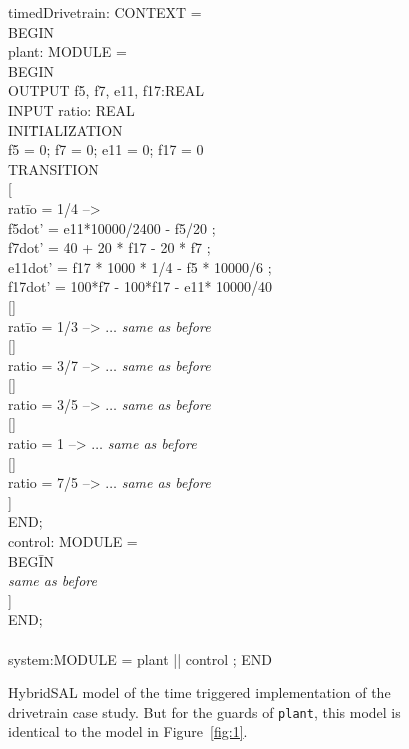 \documentclass{llncs}
\begin{document}
\begin{figure}[htb!]
\begin{tt}
\begin{tabbing}
timedDrivetrain: CONTEXT = 
\\
BEGIN
\\
plant: MODULE =
\\
BEGIN
\\
OUTPUT f5, f7, e11, f17:REAL
\\
INPUT ratio: REAL
\\
INI\=TIALIZATION
\\ \>
  f5 = 0; f7 = 0; e11 = 0; f17 = 0
\\
TRANSITION
\\
\mbox{[}
\\
rat\=io = 1/4 -->
\+
\\ 
  f5dot' = e11*10000/2400 - f5/20 ;
\\
  f7dot' = 40 + 20 * f17 - 20 * f7 ;
\\
  e11dot' = f17 * 1000 * 1/4 - f5 * 10000/6 ;
\\
  f17dot' = 100*f7 - 100*f17 - e11* 10000/40
\-
\\ 
 \mbox{[]}
\\ 
rat\=io = 1/3 --> $\ldots$ {\em{ same as before}}
\\
 \mbox{[]}
\\
ratio = 3/7 --> $\ldots$ {\em{ same as before}}
\\
 \mbox{[]}
\\
ratio = 3/5 --> $\ldots$ {\em{ same as before}}
\\
 \mbox{[]}
\\
ratio = 1 --> $\ldots$ {\em{ same as before}}
\\
 \mbox{[]}
\\
ratio = 7/5 --> $\ldots$ {\em{ same as before}}
\\
 \mbox{]}
\\
END;
\\
control: MODULE =
\\
BEG\=IN
\\ \>
 {\em{same as before}}
\\
]
\\
END;
\\

\\
system:MODULE  = plant || control ;
END
\end{tabbing}
\end{tt}
\caption{HybridSAL model of the time triggered implementation of the drivetrain case study. 
But for the guards of {\tt{plant}}, this model is identical to the model in
Figure~\ref{fig:1}.}
\label{fig:3}
\end{figure}
\end{document}
